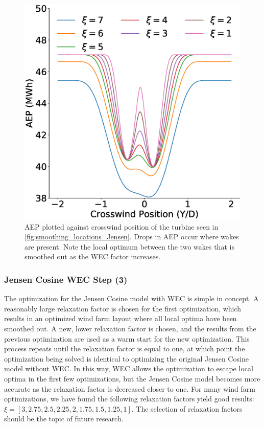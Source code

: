 \documentclass[a4paper]{jpconf}
\begin{document}
\begin{figure}[ht]
\begin{minipage}[t]{0.52\textwidth}
		\includegraphics[width=\textwidth]{JensenWECMultipleTurbinesAEP}
		\caption{AEP plotted against crosswind position of the turbine seen in \cref{fig:smoothing_locations_Jensen}. Drops in AEP occur where wakes are present. Note the local optimum between the two wakes that is smoothed out as the WEC factor increases.}
		\label{fig:JensenLocalOptSmoothed}
	\end{minipage}
\end{figure}

\subsubsection{Jensen Cosine WEC Step (3)}

The optimization for the Jensen Cosine model with WEC is simple in concept. A reasonably large relaxation factor is chosen for the first optimization, which results in an optimized wind farm layout where all local optima have been smoothed out. A new, lower relaxation factor is chosen, and the results from the previous optimization are used as a warm start for the new optimization. This process repeats until the relaxation factor is equal to one, at which point the optimization being solved is identical to optimizing the original Jensen Cosine model without WEC. In this way, WEC allows the optimization to escape local optima in the first few optimizations, but the Jensen Cosine model becomes more accurate as the relaxation factor is decreased closer to one. For many wind farm optimizations, we have found the following relaxation factors yield good results: $\xi = [3, 2.75, 2.5, 2.25, 2, 1.75, 1.5, 1.25, 1]$. The selection of relaxation factors should be the topic of future research.
\end{document}
